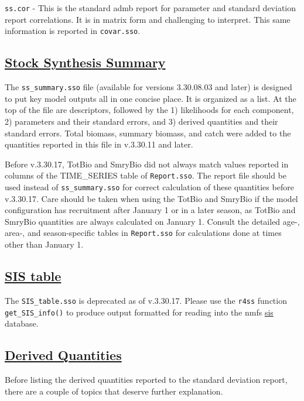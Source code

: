 \texttt{ss.cor} - This is the standard \gls{admb} report for parameter and standard deviation report correlations. It is in matrix form and challenging to interpret. This same information is reported in \texttt{covar.sso}.

\hypertarget{SS3Summary}{}
\subsection[Stock Synthesis Summary]{\protect\hyperlink{SS3Summary}{Stock Synthesis Summary}}
The \texttt{ss\_summary.sso} file (available for versions 3.30.08.03 and later) is designed to put key model outputs all in one concise place. It is organized as a list. At the top of the file are descriptors, followed by the 1) likelihoods for each component, 2) parameters and their standard errors, and 3) derived quantities and their standard errors. Total biomass, summary biomass, and catch were added to the quantities reported in this file in v.3.30.11 and later.

Before v.3.30.17, TotBio and SmryBio did not always match values reported in columns of the TIME\_SERIES table of \texttt{Report.sso}. The report file should be used instead of \texttt{ss\_summary.sso} for correct calculation of these quantities before v.3.30.17. Care should be taken when using the TotBio and SmryBio if the model configuration has recruitment after January 1 or in a later season, as TotBio and SmryBio quantities are always calculated on January 1. Consult the detailed age-, area-, and season-specific tables in \texttt{Report.sso} for calculations done at times other than January 1.

\hypertarget{SIStable}{}
\subsection[SIS table]{\protect\hyperlink{SIStable}{SIS table}}
The \texttt{SIS\_table.sso} is deprecated as of v.3.30.17. Please use the \texttt{r4ss} function \texttt{get\_SIS\_info()} to produce output formatted for reading into the \gls{nmfs} \href{https://www.st.nmfs.noaa.gov/sis/}{\gls{sis}} database.

\hypertarget{DerivedQuant}{}
\subsection[Derived Quantities]{\protect\hyperlink{DerivedQuant}{Derived Quantities}}
Before listing the derived quantities reported to the standard deviation report, there are a couple of topics that deserve further explanation.

